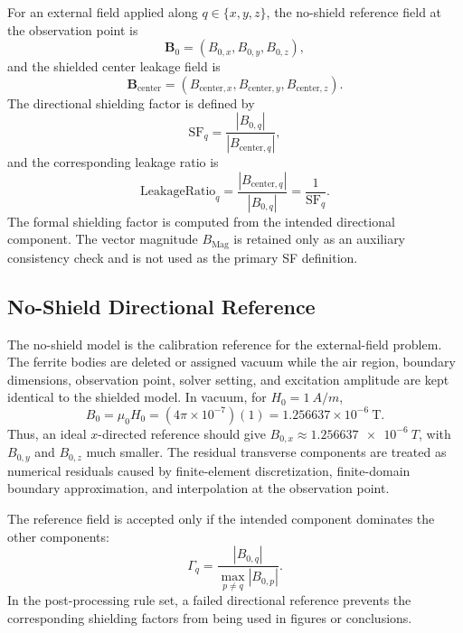 \documentclass[letterpaper,journal]{IEEEtran}
\begin{document}
For an external field applied along $q\in\{x,y,z\}$, the no-shield reference field at the observation point is
\begin{equation}
\mathbf{B}_0=(B_{0,x},B_{0,y},B_{0,z}),
\label{eq:B0}
\end{equation}
and the shielded center leakage field is
\begin{equation}
\mathbf{B}_{\mathrm{center}}=(B_{\mathrm{center},x},B_{\mathrm{center},y},B_{\mathrm{center},z}).
\label{eq:Bcenter}
\end{equation}
The directional shielding factor is defined by
\begin{equation}
\mathrm{SF}_q=\frac{|B_{0,q}|}{|B_{\mathrm{center},q}|},
\label{eq:sfq}
\end{equation}
and the corresponding leakage ratio is
\begin{equation}
\mathrm{LeakageRatio}_q=\frac{|B_{\mathrm{center},q}|}{|B_{0,q}|}=\frac{1}{\mathrm{SF}_q}.
\label{eq:leakage}
\end{equation}
The formal shielding factor is computed from the intended directional component. The vector magnitude $B_{\mathrm{Mag}}$ is retained only as an auxiliary consistency check and is not used as the primary SF definition.

\subsection{No-Shield Directional Reference}

The no-shield model is the calibration reference for the external-field problem. The ferrite bodies are deleted or assigned vacuum while the air region, boundary dimensions, observation point, solver setting, and excitation amplitude are kept identical to the shielded model. In vacuum, for $H_0=\SI{1}{A/m}$,
\begin{equation}
B_0=\mu_0 H_0=(4\pi\times10^{-7})(1)=1.256637\times10^{-6}\ \mathrm{T}.
\label{eq:vacuum}
\end{equation}
Thus, an ideal $x$-directed reference should give $B_{0,x}\approx\SI{1.256637e-6}{T}$, with $B_{0,y}$ and $B_{0,z}$ much smaller. The residual transverse components are treated as numerical residuals caused by finite-element discretization, finite-domain boundary approximation, and interpolation at the observation point.

The reference field is accepted only if the intended component dominates the other components:
\begin{equation}
\Gamma_q=\frac{|B_{0,q}|}{\max_{p\ne q}|B_{0,p}|}.
\label{eq:purity}
\end{equation}
In the post-processing rule set, a failed directional reference prevents the corresponding shielding factors from being used in figures or conclusions.
\end{document}
